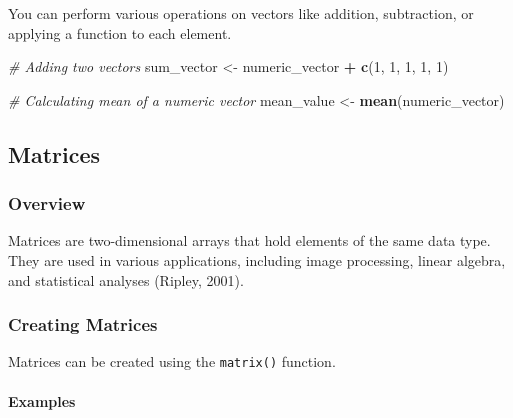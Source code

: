 \documentclass[
]{book}
\newenvironment{Shaded}{\begin{snugshade}}{\end{snugshade}}
\newcommand{\CommentTok}[1]{\textcolor[rgb]{0.56,0.35,0.01}{\textit{#1}}}
\newcommand{\DecValTok}[1]{\textcolor[rgb]{0.00,0.00,0.81}{#1}}
\newcommand{\FunctionTok}[1]{\textcolor[rgb]{0.13,0.29,0.53}{\textbf{#1}}}
\newcommand{\NormalTok}[1]{#1}
\newcommand{\OtherTok}[1]{\textcolor[rgb]{0.56,0.35,0.01}{#1}}
\newcommand{\SpecialCharTok}[1]{\textcolor[rgb]{0.81,0.36,0.00}{\textbf{#1}}}
\begin{document}
You can perform various operations on vectors like addition, subtraction, or applying a function to each element.

\begin{Shaded}
\begin{Highlighting}[]
\CommentTok{\# Adding two vectors}
\NormalTok{sum\_vector }\OtherTok{\textless{}{-}}\NormalTok{ numeric\_vector }\SpecialCharTok{+} \FunctionTok{c}\NormalTok{(}\DecValTok{1}\NormalTok{, }\DecValTok{1}\NormalTok{, }\DecValTok{1}\NormalTok{, }\DecValTok{1}\NormalTok{, }\DecValTok{1}\NormalTok{)}

\CommentTok{\# Calculating mean of a numeric vector}
\NormalTok{mean\_value }\OtherTok{\textless{}{-}} \FunctionTok{mean}\NormalTok{(numeric\_vector)}
\end{Highlighting}
\end{Shaded}

\hypertarget{matrices}{%
\subsection*{Matrices}\label{matrices}}

\hypertarget{overview-3}{%
\subsubsection*{Overview}\label{overview-3}}

Matrices are two-dimensional arrays that hold elements of the same data type. They are used in various applications, including image processing, linear algebra, and statistical analyses (Ripley, 2001).

\hypertarget{creating-matrices}{%
\subsubsection*{Creating Matrices}\label{creating-matrices}}

Matrices can be created using the \texttt{matrix()} function.

\hypertarget{examples-3}{%
\paragraph*{Examples}\label{examples-3}}
\end{document}
